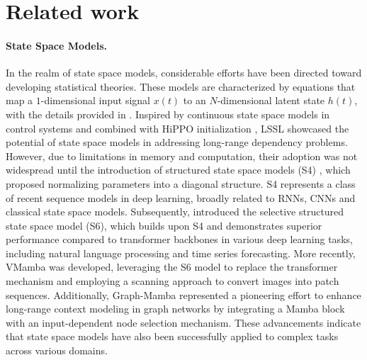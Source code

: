 \section{Related work}
\label{RelatedWork}


\paragraph{State Space Models.} In the realm of state space models, considerable efforts have been directed toward developing statistical theories. These models are characterized by equations that map a $1$-dimensional input signal $x(t)$ to an $N$-dimensional latent state $h(t)$, with the details provided in . Inspired by continuous state space models in control systems and combined with HiPPO initialization \citep{gu2020hippo}, LSSL \citep{gu2021combiningrecurrentconvolutionalcontinuoustime} showcased the potential of state space models in addressing long-range dependency problems. 
However, due to limitations in memory and computation, their adoption was not widespread until the introduction of structured state space models (S4) \citep{gu2021efficiently}, which proposed normalizing parameters into a diagonal structure. S4 represents a class of recent sequence models in deep learning, broadly related to RNNs, CNNs and classical state space models. Subsequently, \cite{gu2023mamba} introduced the selective structured state space model (S6), which builds upon S4 and demonstrates superior performance compared to transformer backbones in various deep learning tasks, including natural language processing and time series forecasting. 
More recently, VMamba \citep{liu2024vmamba} was developed, leveraging the S6 model to replace the transformer mechanism and employing a scanning approach to convert images into patch sequences. Additionally, Graph-Mamba \citep{wang2024graph} represented a pioneering effort to enhance long-range context modeling in graph networks by integrating a Mamba block with an input-dependent node selection mechanism. These advancements indicate that state space models have also been successfully applied to complex tasks across various domains.


